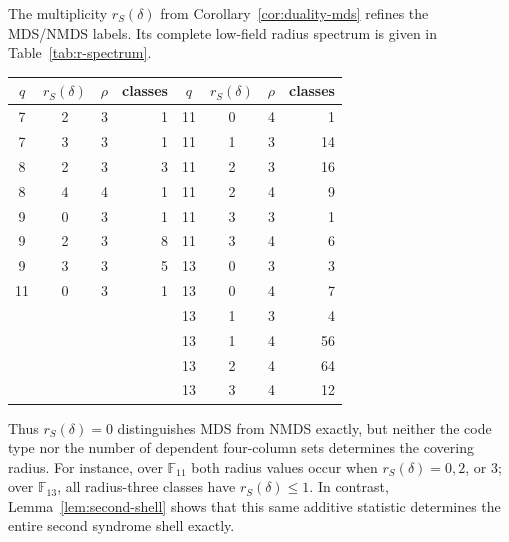 ﻿\documentclass[11pt]{article}
\newcommand{\F}{\mathbb F}
\theoremstyle{plain}
\theoremstyle{definition}
\begin{document}
The multiplicity \(r_S(\delta)\) from Corollary~\ref{cor:duality-mds}
refines the MDS/NMDS labels.  Its complete low-field radius spectrum is
given in Table~\ref{tab:r-spectrum}.
\begin{center}
\label{tab:r-spectrum}
\small
\begin{tabular}{c c r r@{\qquad}c c r r}
\toprule
\(q\)&\(r_S(\delta)\)&\(\rho\)&classes&
\(q\)&\(r_S(\delta)\)&\(\rho\)&classes\\
\midrule
7&2&3&1  & 11&0&4&1\\
7&3&3&1  & 11&1&3&14\\
8&2&3&3  & 11&2&3&16\\
8&4&4&1  & 11&2&4&9\\
9&0&3&1  & 11&3&3&1\\
9&2&3&8  & 11&3&4&6\\
9&3&3&5  & 13&0&3&3\\
11&0&3&1 & 13&0&4&7\\
          & & & & 13&1&3&4\\
          & & & & 13&1&4&56\\
          & & & & 13&2&4&64\\
          & & & & 13&3&4&12\\
\bottomrule
\end{tabular}
\end{center}
Thus \(r_S(\delta)=0\) distinguishes MDS from NMDS exactly, but neither
the code type nor the number of dependent four-column sets determines the
covering radius.  For instance, over \(\F_{11}\) both radius values occur
when \(r_S(\delta)=0,2\), or \(3\); over \(\F_{13}\), all radius-three
classes have \(r_S(\delta)\le1\).
In contrast, Lemma~\ref{lem:second-shell} shows that this same
additive statistic determines the entire second syndrome shell exactly.
\end{document}
